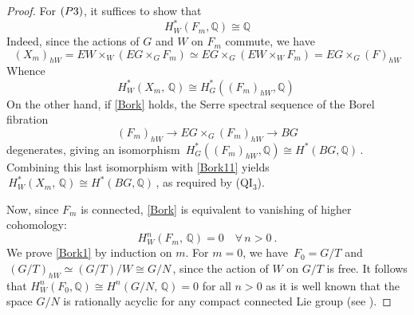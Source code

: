 \documentclass[11pt]{amsart}
\theoremstyle{definition}
\theoremstyle{remark}
\numberwithin{equation}{section}
\newcommand{\la}{\label}
\def\Q{\mathbb{Q}}
\begin{document}
\begin{proof}
For $({\rm P3})$, it suffices to show that
%
\begin{equation}
\la{Bork}
H^*_W(F_m, \Q) \cong \Q
\end{equation}
%
Indeed, since the actions of $G$ and $W$ on $F_m$ commute, we have  
$$ 
(X_m)_{hW} = EW \times_W (EG \times_G F_m) \simeq EG \times_G (EW \times_W F_m) = EG \times_G (F)_{hW}
$$ 
%
Whence
%
\begin{equation}
\la{Bork11}
H_W^*(X_m,\,\Q) \cong H^*_G((F_m)_{hW}, \Q)\ 
\end{equation}
%
On the other hand, if \eqref{Bork} holds, the Serre spectral sequence of the Borel fibration 
%
$$
(F_m)_{hW} \to EG \times_G (F_m)_{hW} \to BG
$$
%
degenerates, giving an isomorphism $\, H^*_G((F_m)_{hW}, \Q) \cong H^*(BG, \Q)\,$. Combining this last isomorphism with \eqref{Bork11} yields $\, H_W^*(X_m,\,\Q) \cong H^*(BG, \Q) \,$, as required by (QI$_{3}$).

Now, since $F_m $ is connected, \eqref{Bork} is equivalent to vanishing of higher cohomology:
%
\begin{equation}
\la{Bork1}
H^n_W(F_m, \,\Q) = 0 \quad \forall\, n > 0\ .
\end{equation}
%
We prove \eqref{Bork1} by induction on $ m $. For $ m = 0 $, we have $\, F_0 = G/T $ and
$\, (G/T)_{hW} \simeq (G/T)/W \cong G/N\,$, since the action of $W$ on $G/T$ is free. 
It follows that $ H^n_{W}(F_0, \Q) \cong H^n(G/N,\,\Q) = 0 $ for all $ n > 0 $ as
it is well known that the space $G/N$ is rationally acyclic for any compact connected  Lie group (see \cite[Theorem 20.3]{Bo67}).


\end{proof}
\end{document}
